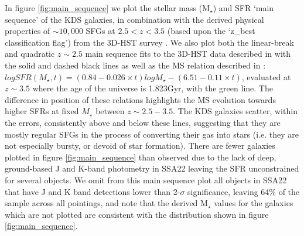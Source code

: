 \documentclass[fleqn,usenatbib]{mn2e}
\begin{document}
In figure \ref{fig:main_sequence} we plot the stellar mass (M$_{\star}$) and SFR `main sequence' of the KDS galaxies, in combination with the derived physical properties of $\sim 10,000$ SFGs at $2.5 < z < 3.5$  (based upon the `z\_best classification flag') from the 3D-HST survey \citep{Brammer2012,Momcheva2016}.
We also plot both the linear-break and quadratic $z\sim 2.5$ main sequence fits to the 3D-HST data described in \cite{Whitaker2014} with the solid and dashed black lines as well as the MS relation described in \cite{Speagle2014}: $logSFR(M_{\star}, t) = (0.84 - 0.026 \times t)logM_{\star} - (6.51 - 0.11 \times t)$, evaluated at $z\sim3.5$ where the age of the universe is 1.823Gyr, with the green line.
The difference in position of these relations highlights the MS evolution towards higher SFRs at fixed $M_{\star}$ between $z\sim2.5-3.5$.
The KDS galaxies scatter, within the errors, consistently above and below these lines, suggesting that they are mostly regular SFGs in the process of converting their gas into stars (i.e. they are not especially bursty, or devoid of star formation).
There are fewer galaxies plotted in figure \ref{fig:main_sequence} than observed due to the lack of deep, ground-based J and K-band photometry in SSA22 leaving the SFR unconstrained for several objects.
We omit from this main sequence plot all objects in SSA22 that have J and K band detections lower than 2-$\sigma$ significance, leaving 64\% of the sample across all pointings, and note that the derived M$_{\star}$ values for the galaxies which are not plotted are consistent with the distribution shown in figure \ref{fig:main_sequence}.
\end{document}
